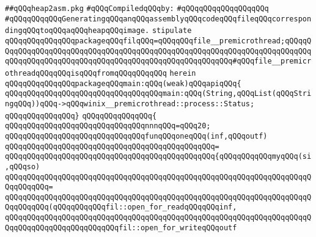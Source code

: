 \label{src/app/heap2asm/heap2asm.pkg}
\verb|##qQQqheap2asm.pkg|\newline
\newline
\verb|#qQQqCompiledqQQqby:|\newline
\verb|#qQQqqQQqqQQqqQQqqQQq|\newline
\newline
\verb|#qQQqqQQqqQQqGeneratingqQQqanqQQqassemblyqQQqcodeqQQqfileqQQqcorrespondingqQQqtoqQQqaqQQqheapqQQqimage.|\newline
\newline
\verb|stipulate|\newline
\verb|qQQqqQQqqQQqqQQqpackageqQQqfilqQQq=qQQqqQQqfile__premicrothread;qQQqqQQqqQQqqQQqqQQqqQQqqQQqqQQqqQQqqQQqqQQqqQQqqQQqqQQqqQQqqQQqqQQqqQQqqQQqqQQqqQQqqQQqqQQqqQQqqQQqqQQqqQQqqQQqqQQqqQQqqQQqqQQq#qQQqfile__premicrothreadqQQqqQQqisqQQqfromqQQqqQQqqQQq|\newline
\verb|herein|\newline
\newline
\verb|qQQqqQQqqQQqqQQqpackageqQQqmain:qQQq(weak)qQQqapiqQQq{|\newline
\verb|qQQqqQQqqQQqqQQqqQQqqQQqqQQqqQQqqQQqmain:qQQq(String,qQQqList(qQQqStringqQQq))qQQq->qQQqwinix__premicrothread::process::Status;|\newline
\verb|qQQqqQQqqQQqqQQq}|\newline
\verb|qQQqqQQqqQQqqQQq{|\newline
\verb|qQQqqQQqqQQqqQQqqQQqqQQqqQQqqQQqnnnqQQq=qQQq20;|\newline
\newline
\verb|qQQqqQQqqQQqqQQqqQQqqQQqqQQqqQQqfunqQQqoneqQQq(inf,qQQqoutf)|\newline
\verb|qQQqqQQqqQQqqQQqqQQqqQQqqQQqqQQqqQQqqQQqqQQqqQQq=|\newline
\verb|qQQqqQQqqQQqqQQqqQQqqQQqqQQqqQQqqQQqqQQqqQQqqQQq{qQQqqQQqqQQqmyqQQq(si,qQQqso)|\newline
\verb|qQQqqQQqqQQqqQQqqQQqqQQqqQQqqQQqqQQqqQQqqQQqqQQqqQQqqQQqqQQqqQQqqQQqqQQqqQQqqQQq=|\newline
\verb|qQQqqQQqqQQqqQQqqQQqqQQqqQQqqQQqqQQqqQQqqQQqqQQqqQQqqQQqqQQqqQQqqQQqqQQqqQQqqQQq(qQQqqQQqqQQqfil::open_for_readqQQqqQQqinf,|\newline
\verb|qQQqqQQqqQQqqQQqqQQqqQQqqQQqqQQqqQQqqQQqqQQqqQQqqQQqqQQqqQQqqQQqqQQqqQQqqQQqqQQqqQQqqQQqqQQqqQQqfil::open_for_writeqQQqoutf|\newline
